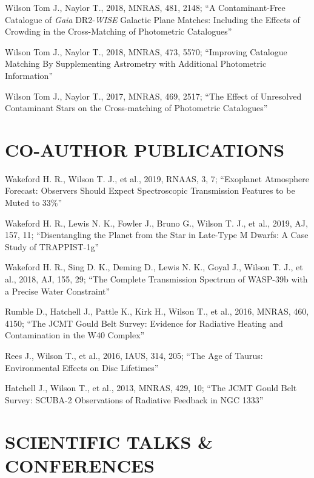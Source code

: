 \documentclass[letter, margin, 10pt]{res} %
\begin{document}
\begin{resume}
Wilson Tom J., Naylor T., 2018, MNRAS, 481, 2148; ``A Contaminant-Free Catalogue of \textit{Gaia} DR2-\textit{WISE} Galactic Plane Matches: Including the Effects of Crowding in the Cross-Matching of Photometric Catalogues''

Wilson Tom J., Naylor T., 2018, MNRAS, 473, 5570; ``Improving Catalogue Matching By Supplementing Astrometry with Additional Photometric Information''

Wilson Tom J., Naylor T., 2017, MNRAS, 469, 2517; ``The Effect of Unresolved Contaminant Stars on the Cross-matching of Photometric Catalogues''

\section{CO-AUTHOR PUBLICATIONS}
  
Wakeford H. R., Wilson T. J., et al., 2019, RNAAS, 3, 7; ``Exoplanet Atmosphere Forecast: Observers Should Expect Spectroscopic Transmission Features to be Muted to 33\%''

Wakeford H. R., Lewis N. K., Fowler J., Bruno G., Wilson T. J., et al., 2019, AJ, 157, 11; ``Disentangling the Planet from the Star in Late-Type M Dwarfs: A Case Study of TRAPPIST-1g''

Wakeford H. R., Sing D. K., Deming D., Lewis N. K., Goyal J., Wilson T. J., et al., 2018, AJ, 155, 29; ``The Complete Transmission Spectrum of WASP-39b with a Precise Water Constraint''

Rumble D., Hatchell J., Pattle K., Kirk H., Wilson T., et al., 2016, MNRAS, 460, 4150; ``The JCMT Gould Belt Survey: Evidence for Radiative Heating and Contamination in the W40 Complex''

Rees J., Wilson T., et al., 2016, IAUS, 314, 205; ``The Age of Taurus: Environmental Effects on Disc Lifetimes''

Hatchell J., Wilson T., et al., 2013, MNRAS, 429, 10; ``The JCMT Gould Belt Survey: SCUBA-2 Observations of Radiative Feedback in NGC 1333''


\parskip \baselineskip
\section{SCIENTIFIC TALKS \& CONFERENCES}


\end{resume}
\end{document}
